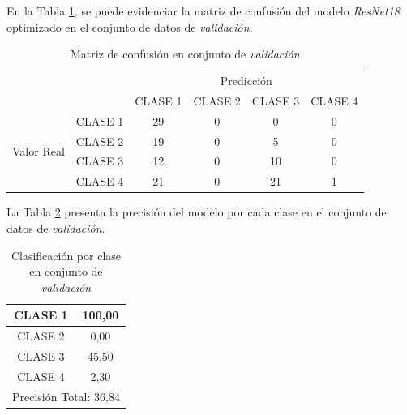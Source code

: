 \vspace{0.5cm}

En la Tabla \ref{tab:MC_resnet_OPT}, se puede evidenciar la matriz de confusión del modelo \textit{ResNet18} optimizado en el conjunto de datos de \textit{validación}.

\vspace{0.5cm}

\begin{table}[htbp]
	\centering
	\resizebox{13cm}{!} {
	\begin{tabular}{|c|l|c|c|c|c|}
		\hline
		\multicolumn{2}{|c|}{\multirow{2}[4]{*}{}} & \multicolumn{4}{c|}{Predicción} \bigstrut\\
		\cline{3-6}    \multicolumn{2}{|c|}{} & CLASE 1 & CLASE 2 & CLASE 3 & CLASE 4 \bigstrut\\
		\hline
		\multirow{4}[8]{*}{\begin{sideways}Valor Real\end{sideways}} & CLASE 1 & 29     & 0     & 0    & 0 \bigstrut\\
		\cline{2-6}          & CLASE 2 & 19     & 0     & 5    & 0 \bigstrut\\
		\cline{2-6}          & CLASE 3 & 12     & 0     & 10    & 0 \bigstrut\\
		\cline{2-6}          & CLASE 4 & 21     & 0     & 21    & 1 \bigstrut\\
		\hline
	\end{tabular}
	}
	\caption{Matriz de confusión en conjunto de \textit{validación}}
	\label{tab:MC_resnet_OPT}%
\end{table}

\newpage
La Tabla \ref{tab:resnetoptclases} presenta la precisión del modelo por cada clase en el conjunto de datos de \textit{validación}.

\begin{table}[htbp]
	\centering
	\begin{tabular}{|c|c|}
		\hline
		CLASE 1 & 100,00 \bigstrut\\
		\hline
		CLASE 2 & 0,00 \bigstrut\\
		\hline
		CLASE 3 & 45,50 \bigstrut\\
		\hline
		CLASE 4 & 2,30 \bigstrut\\
		\hline
		\multicolumn{2}{|c|}{Precisión Total: 36,84} \bigstrut\\
		\hline
	\end{tabular}%
	\caption{Clasificación por clase en conjunto de \textit{validación}}
	\label{tab:resnetoptclases}%
\end{table}

